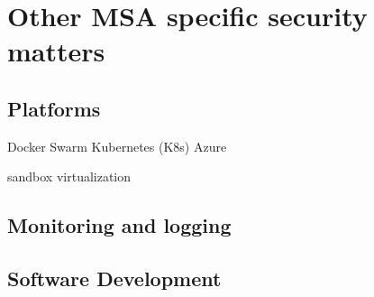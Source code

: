 






\section{Other MSA specific security matters}
\begin{sloppypar}

\end{sloppypar}

\subsection{Platforms}
\begin{sloppypar}
    Docker Swarm
    Kubernetes (K8s)
    Azure
    
    sandbox
    virtualization 
\end{sloppypar}

\subsection{Monitoring and logging}
\begin{sloppypar}

\end{sloppypar}

\subsection{Software Development}
\begin{sloppypar}

\end{sloppypar}

